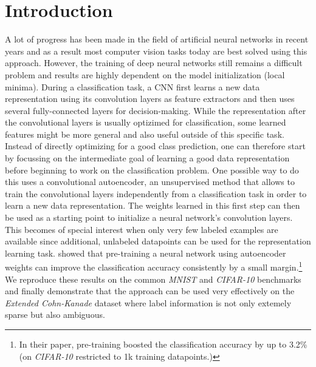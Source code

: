 \documentclass{article}
\begin{document}
\section{Introduction}
  A lot of progress has been made in the field of artificial neural networks in recent years and as a result most computer vision tasks today are best solved using this approach. However, the training of deep neural networks still remains a difficult problem and results are highly dependent on the model initialization (local minima).
  During a classification task, a CNN first learns a new data representation using its convolution layers as feature extractors and then uses several fully-connected layers for decision-making. 
  While the representation after the convolutional layers is usually optizimed for classification, some learned features might be more general and also useful outside of this specific task. 
  Instead of directly optimizing for a good class prediction, one can therefore start by focussing on the intermediate goal of learning a good data representation before beginning to work on the classification problem.
  One possible way to do this uses a convolutional autoencoder, an unsupervised method that allows to train the convolutional layers independently from a classification task in order to learn a new data representation. 
  The weights learned in this first step can then be used as a starting point to initialize a neural network's convolution layers. 
  This becomes of special interest when only very few labeled examples are available since additional, unlabeled datapoints can be used for the representation learning task. 
  \citep{masci2011stacked} showed that pre-training a neural network using autoencoder weights can improve the classification accuracy consistently by a small margin.\footnote{In their paper, pre-training boosted the classification accuracy by up to 3.2\% (on \emph{CIFAR-10} restricted to 1k training datapoints.)}
  We reproduce these results on the common \emph{MNIST} \citep{lecun1998mnist} and \emph{CIFAR-10} \citep{krizhevsky2009learning} benchmarks and finally demonstrate that the approach can be used very effectively on the \emph{Extended Cohn-Kanade} \citep{kanade2000comprehensive,lucey2010extended} dataset where label information is not only extemely sparse but also ambiguous. 
\end{document}
